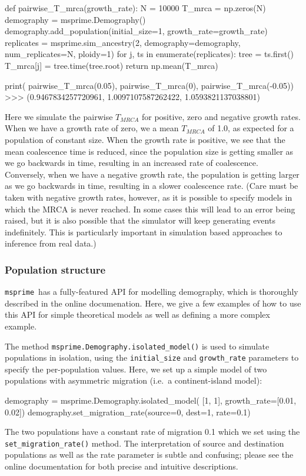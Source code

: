 \documentclass[graybox]{svmult}
\newcommand{\msprime}[0]{\texttt{msprime}}
\begin{document}
\begin{pythoncode}
def pairwise_T_mrca(growth_rate):
    N = 10000
    T_mrca = np.zeros(N)
    demography = msprime.Demography()
    demography.add_population(initial_size=1, growth_rate=growth_rate)
    replicates = msprime.sim_ancestry(2, demography=demography,
        num_replicates=N, ploidy=1)
    for j, ts in enumerate(replicates):
        tree = ts.first()
        T_mrca[j] = tree.time(tree.root)
    return np.mean(T_mrca)

print(
    pairwise_T_mrca(0.05), pairwise_T_mrca(0),
    pairwise_T_mrca(-0.05))
>>> (0.9467834257720961, 1.0097107587262422, 1.0593821137038801)
\end{pythoncode}

Here we simulate the pairwise \(T_{MRCA}\) for positive, zero and
negative growth rates. When we have a growth rate of zero, we
a mean \(T_{MRCA}\) of 1.0, as expected for a population of constant size. When the growth rate is positive, we see that the
mean coalescence time is reduced, since the population size is getting
smaller as we go backwards in time, resulting in an increased rate of
coalescence. Conversely, when we have a negative growth rate, the
population is getting larger as we go backwards in time, resulting in a
slower coalescence rate. (Care must be taken with negative growth rates,
however, as it is possible to specify models in which the MRCA is never
reached. In some cases this will lead to an error being raised, but it
is also possible that the simulator will keep generating events
indefinitely. This is particularly important in simulation based
approaches to inference from real data.)

\subsubsection{Population structure}\label{population-structure}
\msprime\ has a fully-featured API for modelling demography, which
is thoroughly described in the online documenation. Here, we give a few examples
of how to use this API for simple theoretical models as well as
defining a more complex example.

\label{isolated-model}
The method \texttt{msprime.Demography.isolated\_model()} is used to
simulate populations in isolation,
using the  \texttt{initial\_size} and
\texttt{growth\_rate} parameters to specify the per-population
values.
Here, we set up a simple model of two populations with asymmetric
migration (i.e.\ a continent-island model):
\begin{pythoncode}
    demography = msprime.Demography.isolated_model(
        [1, 1], growth_rate=[0.01, 0.02])
    demography.set_migration_rate(source=0, dest=1, rate=0.1)
\end{pythoncode}
The two populations have a constant rate of migration 0.1 which we set
using the \texttt{set\_migration\_rate()}
method. The interpretation of source and destination populations
as well as the rate parameter is subtle and confusing; please see
the online documentation for both precise and intuitive descriptions.
\end{document}

